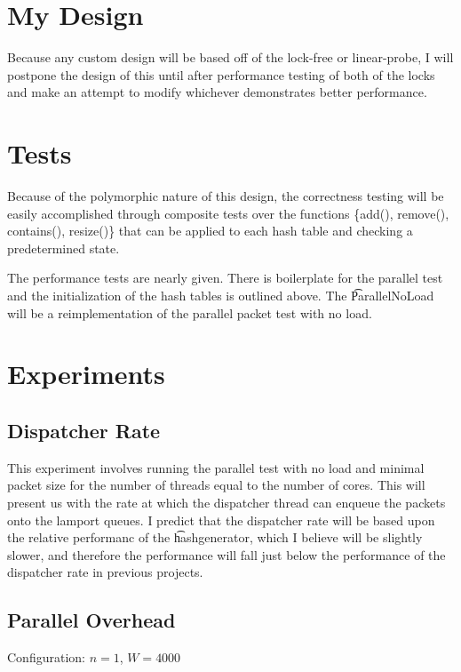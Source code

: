 \section{My Design}

Because any custom design will be based off of the lock-free or
linear-probe, I will postpone the design of this until after
performance testing of both of the locks and make an attempt to modify
whichever demonstrates better performance.

\section{Tests}

Because of the polymorphic nature of this design, the correctness
testing will be easily accomplished through composite tests over the
functions
\{add(), remove(), contains(), resize()\} that can be applied to each
hash table and checking a predetermined state.  

The performance tests are nearly given. There is boilerplate for the
parallel test and the initialization of the hash tables is outlined
above. The \t{ParallelNoLoad} will be a reimplementation of the
parallel packet test with no load.


\section{Experiments}

\subsection{Dispatcher Rate}

This experiment involves running the parallel test with no load and
minimal packet size for the number of threads equal to the number of
cores. This will present us with the rate at which the dispatcher
thread can enqueue the packets onto the lamport queues. I predict that
the dispatcher rate will be based upon the relative performanc of
the \t{hashgenerator}, which I believe will be slightly slower, and
therefore the performance will fall just below the performance of the
dispatcher rate in previous projects.


\subsection{Parallel Overhead}

Configuration: $n = 1$, $W = 4000$ 

